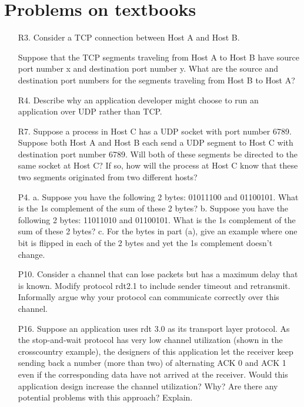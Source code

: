 \documentclass[]{article}
\begin{document}
\section{Problems on textbooks}
	\begin{enumerate}
		\item[R3.] Consider a TCP connection between Host A and Host B. 
		
		Suppose that the TCP segments traveling from Host A to Host B have source port number x and destination port number y. What are the source and destination port numbers for the segments traveling from Host B to Host A?
		
		
		\item[R4.] Describe why an application developer might choose to run an application over UDP rather than TCP.
		
		
		\item[R7.] Suppose a process in Host C has a UDP socket with port number 6789. Suppose both Host A and Host B each send a UDP segment to Host C with destination port number 6789. Will both of these segments be directed to the same socket at Host C? If so, how will the process at Host C know that these two segments originated from two different hosts?
		
		
		\item[P4.] 
		\subitem a. Suppose you have the following 2 bytes: 01011100 and 01100101. What is the 1s complement of the sum of these 2 bytes?
		\subitem b. Suppose you have the following 2 bytes: 11011010 and 01100101. What is the 1s complement of the sum of these 2 bytes?
		\subitem c. For the bytes in part (a), give an example where one bit is flipped in each of the 2 bytes and yet the 1s complement doesn’t change.
		
		
		\item[P10.] Consider a channel that can lose packets but has a maximum delay that is known. Modify protocol rdt2.1 to include sender timeout and retransmit.	Informally argue why your protocol can communicate correctly over this	channel.
		
		
		\item[P16.] Suppose an application uses rdt 3.0 as its transport layer protocol. As the stop-and-wait protocol has very low channel utilization (shown in the crosscountry example), the designers of this application let the receiver keep sending back a number (more than two) of alternating ACK 0 and ACK 1 even if the corresponding data have not arrived at the receiver. Would this application design increase the channel utilization? Why? Are there any potential problems with this approach? Explain.
		
		

\end{enumerate}
\end{document}
